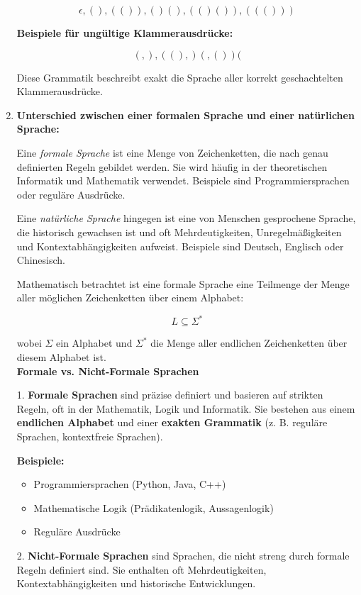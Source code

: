 \documentclass{article}
\begin{document}
\begin{enumerate}
	\[
	\epsilon, (), (()), ()(), (()()), ((()))
	\]
	
	\textbf{Beispiele für ungültige Klammerausdrücke:}
	
	\[
	(, ), ((), )(, ())(
	\]
	
	Diese Grammatik beschreibt exakt die Sprache aller korrekt geschachtelten Klammerausdrücke.
	
	
	\item \textbf{Unterschied zwischen einer formalen Sprache und einer natürlichen Sprache:}
	
	Eine \emph{formale Sprache} ist eine Menge von Zeichenketten, die nach genau definierten Regeln gebildet werden. Sie wird häufig in der theoretischen Informatik und Mathematik verwendet. Beispiele sind Programmiersprachen oder reguläre Ausdrücke.
	
	Eine \emph{natürliche Sprache} hingegen ist eine von Menschen gesprochene Sprache, die historisch gewachsen ist und oft Mehrdeutigkeiten, Unregelmäßigkeiten und Kontextabhängigkeiten aufweist. Beispiele sind Deutsch, Englisch oder Chinesisch.
	
	Mathematisch betrachtet ist eine formale Sprache eine Teilmenge der Menge aller möglichen Zeichenketten über einem Alphabet:
	
	\[
	L \subseteq \Sigma^*
	\]
	
	wobei \(\Sigma\) ein Alphabet und \(\Sigma^*\) die Menge aller endlichen Zeichenketten über diesem Alphabet ist. \\
	
	
	\textbf{Formale vs. Nicht-Formale Sprachen}
	
	1. \textbf{Formale Sprachen} sind präzise definiert und basieren auf strikten Regeln, oft in der Mathematik, Logik und Informatik. Sie bestehen aus einem \textbf{endlichen Alphabet} und einer \textbf{exakten Grammatik} (z. B. reguläre Sprachen, kontextfreie Sprachen).
	
	\textbf{Beispiele:}
	\begin{itemize}
		\item Programmiersprachen (Python, Java, C++)
		\item Mathematische Logik (Prädikatenlogik, Aussagenlogik)
		\item Reguläre Ausdrücke
	\end{itemize}
	
	2. \textbf{Nicht-Formale Sprachen} sind Sprachen, die nicht streng durch formale Regeln definiert sind. Sie enthalten oft Mehrdeutigkeiten, Kontextabhängigkeiten und historische Entwicklungen.
	

\end{enumerate}
\end{document}
